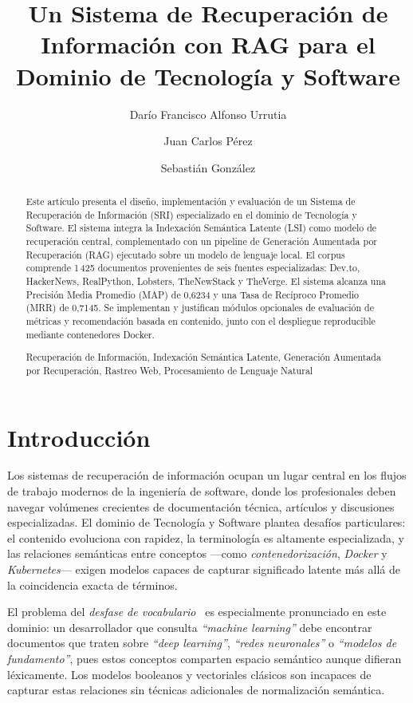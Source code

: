 \documentclass[runningheads,a4paper]{llncs}
\newcommand{\keywords}[1]{\par\addvspace\baselineskip\noindent\keywordname\enspace\ignorespaces#1}
\begin{document}
\mainmatter
\title{Un Sistema de Recuperación de Información con RAG para el Dominio de Tecnología y Software}
\author{Darío Francisco Alfonso Urrutia \and Juan Carlos Pérez \and Sebastián González}
\maketitle
\begin{abstract}
Este artículo presenta el diseño, implementación y evaluación de un Sistema de Recuperación de Información (SRI) especializado en el dominio de Tecnología y Software. El sistema integra la Indexación Semántica Latente (LSI) como modelo de recuperación central, complementado con un pipeline de Generación Aumentada por Recuperación (RAG) ejecutado sobre un modelo de lenguaje local. El corpus comprende 1\,425 documentos provenientes de seis fuentes especializadas: Dev.to, HackerNews, RealPython, Lobsters, TheNewStack y TheVerge. El sistema alcanza una Precisión Media Promedio (MAP) de 0,6234 y una Tasa de Recíproco Promedio (MRR) de 0,7145. Se implementan y justifican módulos opcionales de evaluación de métricas y recomendación basada en contenido, junto con el despliegue reproducible mediante contenedores Docker.
\keywords{Recuperación de Información, Indexación Semántica Latente, Generación Aumentada por Recuperación, Rastreo Web, Procesamiento de Lenguaje Natural}
\end{abstract}

\section{Introducción}

Los sistemas de recuperación de información ocupan un lugar central en los flujos de trabajo modernos de la ingeniería de software, donde los profesionales deben navegar volúmenes crecientes de documentación técnica, artículos y discusiones especializadas. El dominio de Tecnología y Software plantea desafíos particulares: el contenido evoluciona con rapidez, la terminología es altamente especializada, y las relaciones semánticas entre conceptos —como \emph{contenedorización}, \emph{Docker} y \emph{Kubernetes}— exigen modelos capaces de capturar significado latente más allá de la coincidencia exacta de términos.

El problema del \emph{desfase de vocabulario}~\cite{deerwester1990} es especialmente pronunciado en este dominio: un desarrollador que consulta \emph{``machine learning''} debe encontrar documentos que traten sobre \emph{``deep learning''}, \emph{``redes neuronales''} o \emph{``modelos de fundamento''}, pues estos conceptos comparten espacio semántico aunque difieran léxicamente. Los modelos booleanos y vectoriales clásicos son incapaces de capturar estas relaciones sin técnicas adicionales de normalización semántica.
\end{document}
